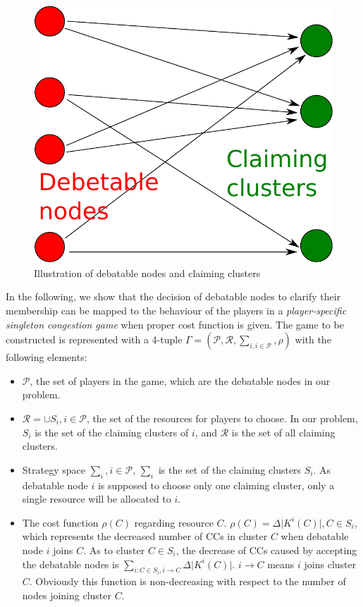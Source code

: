 \documentclass[times]{ettauth}
\theoremstyle{mytheoremstyle}
\theoremstyle{mytheoremstyle}
\theoremstyle{mytheoremstyle}
\begin{document}
\begin{figure}[ht!]
  \centering
  \includegraphics[width=0.37\linewidth]{singletongame_matching.pdf}
  \caption{Illustration of debatable nodes and claiming clusters}
  \label{debatable_nodes_claiming_cluster}
\end{figure}


In the following, we show that the decision of debatable nodes to clarify their membership can be mapped to the behaviour of the players in a \textit{player-specific singleton congestion game} when proper cost function is given.
The game to be constructed is represented with a 4-tuple $\Gamma=(\mathcal{P},\mathcal{R},\sum_{i, i \in \mathcal{P}}, \rho)$ with the following elements:

\begin{itemize}
	\item $\mathcal{P}$, the set of players in the game, which are the debatable nodes in our problem.
	\item $\mathcal{R} = \cup S_i, i\in \mathcal{P}$, the set of the resources for players to choose. In our problem, $S_i$ is the set of the claiming clusters of $i$, and $\mathcal{R}$ is the set of all claiming clusters.
	\item Strategy space $\sum_i, i \in \mathcal{P}$, $\sum_i$ is the set of the claiming clusters $S_i$.
	As debatable node $i$ is supposed to choose only one claiming cluster, only a single resource will be allocated to $i$.%
	\item 	The cost function $\rho(C)$ regarding resource $C$. 
	$\rho(C) = \Delta\vert K^i(C)|, C\in S_i$, which represents the decreased number of CCs in cluster $C$ when debatable node $i$ joins $C$.
	As to cluster $C\in S_i$, the decrease of CCs caused by accepting the debatable nodes is $\sum_{i:C\in S_i, i\rightarrow C} \Delta\vert K^i(C) \vert$. 
$i\rightarrow C$ means $i$ joins cluster $C$.
Obviously this function is non-decreasing with respect to the number of nodes joining cluster $C$.
\end{itemize}
	
\end{document}
